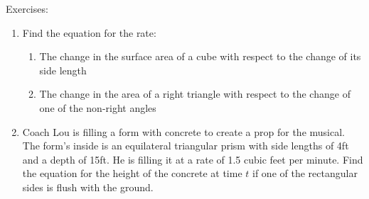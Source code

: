 \documentclass[../revisedmain.tex]{subfiles}
\begin{document}
\begin{center}
	\LARGE Exercises:
\end{center}
\begin{enumerate}
	\item Find the equation for the rate:
	\begin{enumerate}
		\item The change in the surface area of a cube with respect to the change of its side length
		\item The change in the area of a right triangle with respect to the change of one of the non-right angles
	\end{enumerate}
	\item Coach Lou is filling a form with concrete to create a prop for the musical. The form's inside is an equilateral triangular prism with side lengths of 4ft and a depth of 15ft. He is filling it at a rate of 1.5 cubic feet per minute. Find the equation for the height of the concrete at time $t$ if one of the rectangular sides is flush with the ground.
\end{enumerate}
\end{document}
